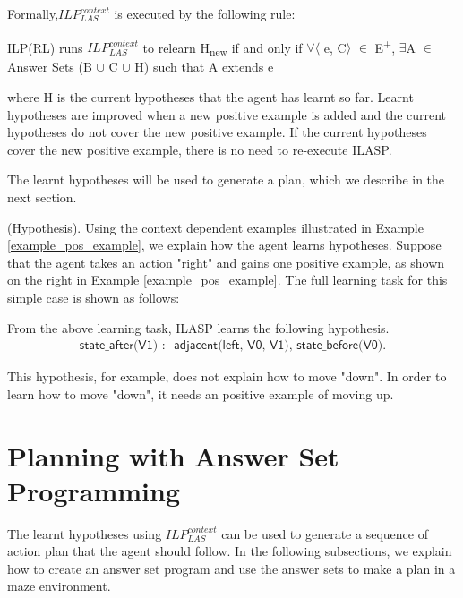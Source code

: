 Formally,$ILP_{LAS}^{context}$ is executed by the following rule:
\begin{defn}\label{def:ILASP_run}
ILP(RL) runs $ILP_{LAS}^{context}$ to relearn H\textsubscript{new} if and only if $\forall$$\langle$ e, C$\rangle$ $\in$ E\textsuperscript{+}, $\exists$A $\in$ Answer Sets (B $\cup$ C $\cup$ H) such that A extends e
\end{defn}
where H is the current hypotheses that the agent has learnt so far. 
Learnt hypotheses are improved when a new positive example is added and the current hypotheses do not cover the new positive example.
If the current hypotheses cover the new positive example, there is no need to re-execute ILASP.

The learnt hypotheses will be used to generate a plan, which we describe in the next section.

\begin{examp} \normalfont (Hypothesis).
Using the context dependent examples illustrated in Example \ref{example_pos_example}, we explain how the agent learns hypotheses.
Suppose that the agent takes an action "right" and gains one positive example, as shown on the right in Example \ref{example_pos_example}. 
The full learning task for this simple case is shown as follows:


From the above learning task, ILASP learns the following hypothesis.
\begin{equation}
\begin{split}
\textsf{state\_after(V1) :- adjacent(left, V0, V1), state\_before(V0).}
\end{split}
\end{equation}



This hypothesis, for example, does not explain how to move "down". In order to learn how to move "down", it needs an positive example of moving up.
\end{examp}

\section{Planning with Answer Set Programming}
\label{sec:planning}

The learnt hypotheses using $ILP_{LAS}^{context}$ can be used to generate a sequence of action plan that the agent should follow.
In the following subsections, we explain how to create an answer set program and use the answer sets to make a plan in a maze environment.
